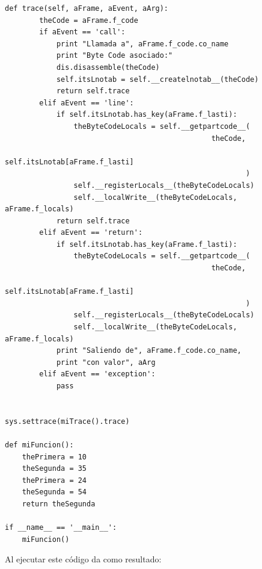 \documentclass[12pt,legalpaper]{report}
\begin{document}
\begin{singlespace}
\begin{lstlisting}[style=Python]
    def trace(self, aFrame, aEvent, aArg):
        theCode = aFrame.f_code
        if aEvent == 'call':
            print "Llamada a", aFrame.f_code.co_name
            print "Byte Code asociado:"
            dis.disassemble(theCode)
            self.itsLnotab = self.__createlnotab__(theCode)
            return self.trace
        elif aEvent == 'line':
            if self.itsLnotab.has_key(aFrame.f_lasti):
                theByteCodeLocals = self.__getpartcode__(
                                                theCode,
                                                self.itsLnotab[aFrame.f_lasti]
                                                        )
                self.__registerLocals__(theByteCodeLocals)
                self.__localWrite__(theByteCodeLocals, aFrame.f_locals)
            return self.trace
        elif aEvent == 'return':
            if self.itsLnotab.has_key(aFrame.f_lasti):
                theByteCodeLocals = self.__getpartcode__(
                                                theCode,
                                                self.itsLnotab[aFrame.f_lasti]
                                                        )
                self.__registerLocals__(theByteCodeLocals)
                self.__localWrite__(theByteCodeLocals, aFrame.f_locals)
            print "Saliendo de", aFrame.f_code.co_name, 
            print "con valor", aArg
        elif aEvent == 'exception':
            pass


sys.settrace(miTrace().trace)
    
def miFuncion():
    thePrimera = 10
    theSegunda = 35
    thePrimera = 24
    theSegunda = 54
    return theSegunda

if __name__ == '__main__':
    miFuncion()
\end{lstlisting}
\end{singlespace}

Al ejecutar este código da como resultado:
\end{document}
